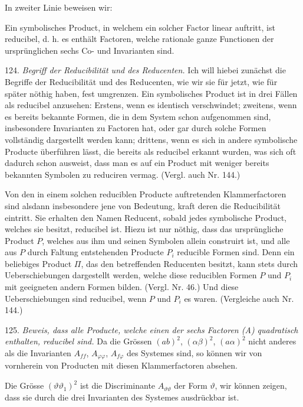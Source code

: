 \documentclass[11pt]{article}
\providecommand{\weberpage}[1]{}
\let\Pi\varPi
\begin{document}
In zweiter Linie beweisen wir:

\glqq Ein symbolisches Product, in welchem ein solcher Factor linear auftritt, ist reducibel, d. h. es enthält Factoren, welche rationale ganze Functionen der ursprünglichen sechs Co- und Invarianten sind.\grqq{}


\weberpage{140}
124. \textit{Begriff der Reducibilität und des Reducenten.} Ich will hiebei zunächst die Begriffe der Reducibilität und des Reducenten, wie wir sie für jetzt, wie für später n\"othig haben, fest umgrenzen. Ein symbolisches Product ist in drei Fällen als reducibel anzusehen: Erstens, wenn es identisch verschwindet; zweitens, wenn es bereits bekannte Formen, die in dem System schon aufgenommen sind, insbesondere Invarianten zu Factoren hat, oder gar durch solche Formen vollständig dargestellt werden kann; drittens, wenn es sich in andere symbolische Producte überführen lässt, die bereits als reducibel erkannt wurden, was sich oft dadurch schon ausweist, dass man es auf ein Product mit weniger bereits bekannten Symbolen zu reduciren vermag. (Vergl. auch Nr. 144.)

Von den in einem solchen reduciblen Producte auftretenden Klammerfactoren sind alsdann insbesondere jene von Bedeutung, kraft deren die Reducibilität eintritt. Sie erhalten den Namen \glqq Reducent\grqq{}, sobald jedes symbolische Product, welches sie besitzt, reducibel ist. Hiezu ist nur n\"othig, dass das ursprüngliche Product $P$, welches aus ihm und seinen Symbolen allein construirt ist, und alle aus $P$ durch Faltung entstehenden Producte $P_i$ reducible Formen sind. Denn ein beliebiges Product $\Pi$, das den betreffenden Reducenten besitzt, kann stets durch Ueberschiebungen dargestellt werden, welche diese reduciblen Formen $P$ und $P_i$ mit geeigneten andern Formen bilden. (Vergl. Nr. 46.) Und diese Ueberschiebungen sind reducibel, wenn $P$ und $P_i$ es waren. (Vergleiche auch Nr. 144.)

125. \textit{Beweis, dass alle Producte, welche einen der sechs Factoren (A) quadratisch enthalten, reducibel sind.} Da die Grössen $(ab)^2$, $(\alpha\beta)^2$, $(a\alpha)^2$ nicht anderes als die Invarianten $A_{ff}$, $A_{\varphi\varphi}$, $A_{f\varphi}$ des Systemes sind, so können wir von vornherein von Producten mit diesen Klammerfactoren absehen.

Die Grösse $(\vartheta\vartheta_1)^2$ ist die Discriminante $A_{\vartheta\vartheta}$ der Form $\vartheta$, wir können zeigen, dass sie durch die drei Invarianten des Systemes ausdrückbar ist.
\end{document}
